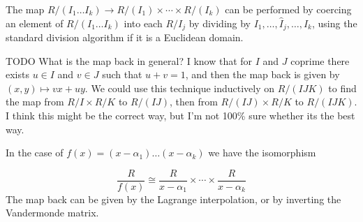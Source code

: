 The map $R/(I_1\ldots I_k) \to R/(I_1) \times \cdots \times R/(I_k)$ can be performed by coercing an element of $R/(I_1 \ldots I_k)$ into each $R / I_j$ by dividing by $I_1, \ldots, \hat{I}_j, \ldots, I_k$, using the standard division algorithm if it is a Euclidean domain. 

TODO What is the map back in general? I know that for $I$ and $J$ coprime there exists $u \in I$ and $v \in J$ such that $u + v = 1$, and then the map back is given by $(x, y) \mapsto vx + uy$. We could use this technique inductively on $R/(IJK)$ to find the map from $R / I \times R / K$ to $R / (IJ)$, then from $R / (IJ) \times R / K$ to $R / (IJK)$. I think this might be the correct way, but I'm not 100\% sure whether its the best way.

In the case of $f(x) = (x - \alpha_1) \ldots (x - \alpha_k)$ we have the isomorphism

\[
    \frac{R}{f(x)} \cong \frac{R}{x - \alpha_1} \times \cdots \times \frac{R}{x - \alpha_k}
\]
The map back can be given by the Lagrange interpolation, or by inverting the Vandermonde matrix. 
